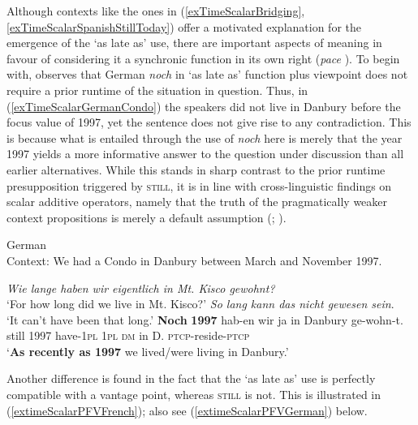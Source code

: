 Although contexts like the ones in (\ref{exTimeScalarBridging}, \ref{exTimeScalarSpanishStillToday}) offer a motivated explanation for the emergence of the \lq as late as' use, there are important aspects of meaning in favour of considering it a synchronic function in its own right (\textit{pace} \cite[162]{MosegaardHansen2008}). To begin with, \textcite{Beck2020} observes that German \textit{noch} in \lq as late as\rq{ }function plus  viewpoint does not require a prior runtime of the situation in question. Thus, in (\ref{exTimeScalarGermanCondo}) the speakers did not live in Danbury before the focus value of 1997, yet the sentence does not give rise to any contradiction. This is because what is entailed through the use of \textit{noch} here is merely that the year 1997 yields a more informative answer to the question under discussion than all earlier alternatives. While this stands in sharp contrast to the prior runtime presupposition triggered by \textsc{still}, it is in line with cross-linguistic findings on scalar additive operators, namely that the truth of the pragmatically weaker context propositions is merely a default assumption (\cite{GastvanderAuwera2011}; \cite{Schwartz2005}).

\begin{exe}
\ex German\\
Context: We had a Condo in Danbury between March and November 1997.\label{exTimeScalarGermanCondo}
	\begin{xlist}
	 \textit{Wie lange haben wir eigentlich in Mt. Kisco gewohnt?}\\
\lq For how long did we live in Mt. Kisco?'
	 \textit{So lang kann das nicht gewesen sein}.\\
\lq It can't have been that long.'
	\exi{}\gll \textbf{Noch} \textbf{1997} hab-en wir ja in Danbury ge-wohn-t.\\
still 1997 have-1\textsc{pl} 1\textsc{pl} \textsc{dm} in D. \textsc{ptcp}-reside-\textsc{ptcp}\\
	\glt \lq \textbf{As recently as 1997} we lived/were living in Danbury.'
	\\\parencite[30 fn13]{Beck2020}
	\end{xlist}
\end{exe}	

Another difference is found in the fact that the \lq as late as\rq{} use is perfectly compatible with a  vantage point, whereas \textsc{still} is not. This is illustrated in (\ref{extimeScalarPFVFrench}); also see (\ref{extimeScalarPFVGerman}) below.

